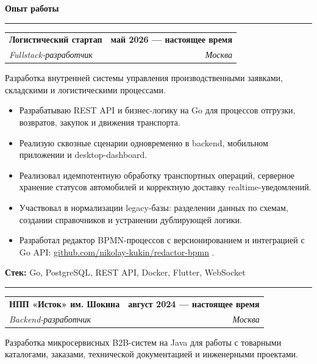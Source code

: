 \documentclass[a4paper,10pt]{article}
\makeatletter
\newcommand{\fontSection}{%
    \fontsize{14.5}{16.8}\selectfont
}
\newcommand{\fontJobTitle}{%
    \fontsize{11.2}{12.8}\selectfont
}
\newcommand{\fontJobDate}{%
    \fontsize{9.9}{11.4}\selectfont
}
\newcommand{\fontJobMeta}{%
    \fontsize{10}{11.4}\selectfont
}
\newcommand{\fontJobDescription}{%
    \fontsize{10}{11.7}\selectfont
}
\newcommand{\fontResumeItem}{%
    \fontsize{9.9}{11.55}\selectfont
}
\newcommand{\fontTech}{%
    \fontsize{9.7}{11.2}\selectfont
}
\newcommand{\spaceBeforeSection}{9pt}
\newcommand{\spaceSectionToLine}{-4.5pt}
\newcommand{\spaceAfterSectionLine}{5.5pt}
\newcommand{\spaceDescriptionToList}{1.5pt}
\newcommand{\spaceJobSeparator}{4.5pt}
\newcommand{\resumeSection}[1]{%
    \par
    \vspace{\spaceBeforeSection}%
    {%
        \fontSection
        \bfseries
        \color{accent}
        #1\par
    }%
    \vspace{\spaceSectionToLine}%
    {%
        \color{accent}
        \noindent
        \rule{\textwidth}{0.7pt}\par
    }%
    \vspace{\spaceAfterSectionLine}%
}
\newcommand{\resumeSubheading}[4]{%
    \begin{tabularx}{\textwidth}{@{}Xr@{}}

        {%
            \fontJobTitle
            \bfseries
            #1
        }
        &
        {%
            \fontJobDate
            \bfseries
            #2
        }

        \\[0.5pt]

        {%
            \fontJobMeta
            \itshape
            #3
        }
        &
        {%
            \fontJobMeta
            \itshape
            #4
        }

    \end{tabularx}

    \vspace{2pt}%
}
\newcommand{\jobDescription}[1]{%
    {%
        \fontJobDescription
        #1\par
    }%
    \vspace{\spaceDescriptionToList}%
}
\newcommand{\resumeItem}[1]{%
    \item {%
        \fontResumeItem
        #1
    }%
}
\newcommand{\resumeItemListStart}{%
    \begin{itemize}
}
\newcommand{\resumeItemListEnd}{%
    \end{itemize}
}
\newcommand{\tech}[1]{%
    \vspace{1pt}%
    {%
        \fontTech
        \textbf{Стек:} #1
    }%
}
\newcommand{\jobSeparator}{%
    \par
    \vspace{\spaceJobSeparator}%
    {%
        \color{lightgray}
        \noindent
        \rule{\textwidth}{0.5pt}\par
    }%
    \vspace{\spaceJobSeparator}%
}
\newcommand{\visibleLink}[2]{%
    \href{#1}{\textcolor{accent}{#2}}%
}
\makeatother
\begin{document}
\vspace{3pt}


\resumeSection{Опыт работы}


\resumeSubheading
    {Логистический стартап}
    {май 2026 — настоящее время}
    {Fullstack-разработчик}
    {Москва}

\jobDescription{
    Разработка внутренней системы управления производственными заявками,
    складскими и логистическими процессами.
}

\resumeItemListStart

    \resumeItem{
        Разрабатываю REST API и бизнес-логику на Go для процессов
        отгрузки, возвратов, закупок и движения транспорта.
    }

    \resumeItem{
        Реализую сквозные сценарии одновременно в backend,
        мобильном приложении и desktop-dashboard.
    }

    \resumeItem{
        Реализовал идемпотентную обработку транспортных операций,
        серверное хранение статусов автомобилей и корректную доставку
        realtime-уведомлений.
    }

    \resumeItem{
        Участвовал в нормализации legacy-базы: разделении данных
        по схемам, создании справочников и устранении дублирующей логики.
    }

    \resumeItem{
        Разработал редактор BPMN-процессов с версионированием
        и интеграцией с Go API:
        \visibleLink
        {https://github.com/nikolay-kukin/redactor-bpmn}
        {github.com/nikolay-kukin/redactor-bpmn}.
    }

\resumeItemListEnd

\tech{Go, PostgreSQL, REST API, Docker, Flutter, WebSocket}

\jobSeparator


\resumeSubheading
    {НПП «Исток» им. Шокина}
    {август 2024 — настоящее время}
    {Backend-разработчик}
    {Москва}

\jobDescription{
    Разработка микросервисных B2B-систем на Java для работы с товарными
    каталогами, заказами, технической документацией и инженерными проектами.
}
\end{document}
